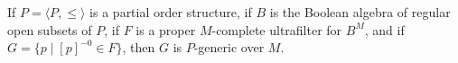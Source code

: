 If $P = \langle P, \leq \rangle$ is a partial order structure, if $B$ is the Boolean algebra of regular open subsets of $P$, if $F$ is a proper $M$-complete ultrafilter for $B^M$, and if $G = \{p \mid [p]^{-0} \in F\}$, then $G$ is $P$-generic over $M$.
